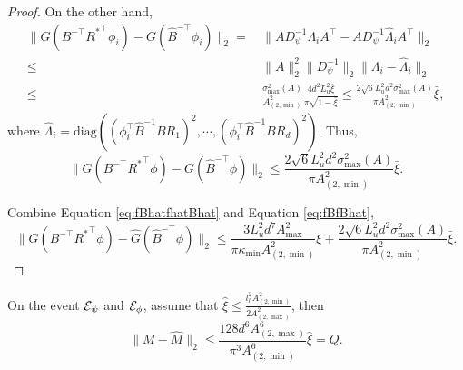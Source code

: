 \begin{proof}
On the other hand, 
\begin{align*}
\|G(B^{-\top}{R^*}^{\top}\phi_i) - G(\widehat{B}^{-\top}\phi_i)\|_2 
= & \, \|A D_{\psi}^{-1}\Lambda_iA^{\top}- A D_{\psi}^{-1}\widehat{\Lambda}_iA^{\top}\|_2 \\
\le & \, \|A\|^2_2 \|D_{\psi}^{-1}\|_2 \|\Lambda_i - \widehat{\Lambda}_i\|_2\\
\le & \, \frac{\sigma_{\max}^2(A)}{A^2_{(2,\min)}}\frac{4d^2L_u^2\bar{\xi}}{\pi\sqrt{1-\bar{\xi}}} \le \frac{2\sqrt{6}L_u^2d^2\sigma_{\max}^2(A)}{\pi A^2_{(2,\min)}}\bar{\xi},
\end{align*}
where $\widehat{\Lambda}_i = \text{diag}\left((\phi_i^{\top}\widehat{B}^{-1}BR_1)^2, \cdots, (\phi_i^{\top}\widehat{B}^{-1}BR_d)^2\right)$.
Thus,
\begin{equation}
\label{eq:fBfBhat}
\|G(B^{-\top}{R^*}^{\top}\phi) - G(\widehat{B}^{-\top}\phi)\|_2 \le \frac{2\sqrt{6}L_u^2d^2\sigma_{\max}^2(A)}{\pi A^2_{(2,\min)}}\bar{\xi}. 
\end{equation}

Combine Equation \eqref{eq:fBhatfhatBhat} and Equation \eqref{eq:fBfBhat},
\[
\|G(B^{-\top}{R^*}^{\top}\phi) - \widehat{G}(\widehat{B}^{-\top}\phi)\|_2
\le 
\frac{3L_u^2d^7A^2_{\max}}{\pi\kappa_{\min}A^2_{(2,\min)}}\xi + \frac{2\sqrt{6}L_u^2d^2\sigma_{\max}^2(A)}{\pi A^2_{(2,\min)}}\bar{\xi}.
\]
\end{proof}

\begin{lemma}
\label{lem:Tvariantion}
On the event $\mathcal{E}_{\psi}$ and $\mathcal{E}_{\phi}$, assume that $\widehat{\xi} \le \frac{l_l^2 A^2_{(2,\min)}}{2A^2_{(2,\max)}}$, then 
\[
\|M - \widehat{M}\|_2 \le  \frac{128d^6A^6_{(2,\max)}}{\pi^3 A^6_{(2,\min)}}\widehat{\xi} = Q.
\]
\end{lemma}

